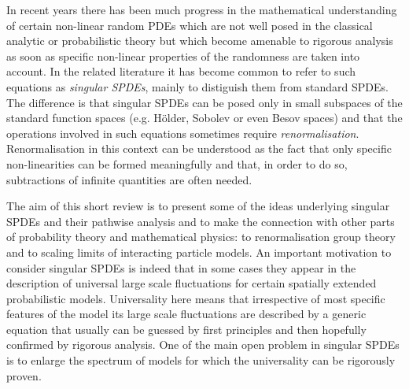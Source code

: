 \documentclass[a4paper, 11pt]{article}
\newcommand{\tmtextit}[1]{{\itshape{#1}}}
\begin{document}
In recent years there has been much progress in the mathematical understanding
of certain non-linear random PDEs which are not well posed in the classical
analytic or probabilistic theory but which become amenable to rigorous
analysis as soon as specific non-linear properties of the randomness are taken
into account. In the related literature it has become common to refer to such
equations as \tmtextit{singular SPDEs}, mainly to distiguish them from
standard SPDEs. The difference is that singular SPDEs can be posed only in
small subspaces of the standard function spaces (e.g. H{\"o}lder, Sobolev or
even Besov spaces) and that the operations involved in such equations
sometimes require \tmtextit{renormalisation}. Renormalisation in this context
can be understood as the fact that only specific non-linearities can be formed
meaningfully and that, in order to do so, subtractions of infinite quantities
are often needed.

The aim of this short review is to present some of the ideas underlying
singular SPDEs and their pathwise analysis and to make the connection with
other parts of probability theory and mathematical physics: to renormalisation
group theory and to scaling limits of interacting particle models. An
important motivation to consider singular SPDEs is indeed that in some cases
they appear in the description of universal large scale
fluctuations for certain spatially extended probabilistic models. Universality
here means that irrespective of most specific features of the model its large
scale fluctuations are described by a generic equation that usually can be
guessed by first principles and then hopefully confirmed by rigorous analysis.
One of the main open problem in singular SPDEs is to enlarge the spectrum of
models for which the universality can be rigorously proven.
\end{document}
